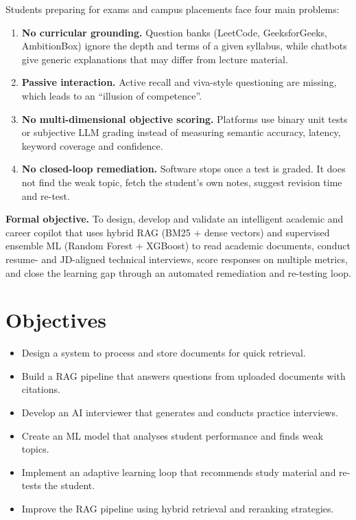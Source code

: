 \documentclass[11pt,a4paper]{report}
\begin{document}
Students preparing for exams and campus placements face four main problems:

\begin{enumerate}
  \item \textbf{No curricular grounding.} Question banks (LeetCode, GeeksforGeeks, AmbitionBox) ignore the depth and terms of a given syllabus, while chatbots give generic explanations that may differ from lecture material.
  \item \textbf{Passive interaction.} Active recall and viva-style questioning are missing, which leads to an ``illusion of competence''.
  \item \textbf{No multi-dimensional objective scoring.} Platforms use binary unit tests or subjective LLM grading instead of measuring semantic accuracy, latency, keyword coverage and confidence.
  \item \textbf{No closed-loop remediation.} Software stops once a test is graded. It does not find the weak topic, fetch the student's own notes, suggest revision time and re-test.
\end{enumerate}

\textbf{Formal objective.} To design, develop and validate an intelligent academic and career copilot that uses hybrid RAG (BM25 + dense vectors) and supervised ensemble ML (Random Forest + XGBoost) to read academic documents, conduct resume- and JD-aligned technical interviews, score responses on multiple metrics, and close the learning gap through an automated remediation and re-testing loop.

\section{Objectives}
\begin{itemize}
  \item Design a system to process and store documents for quick retrieval.
  \item Build a RAG pipeline that answers questions from uploaded documents with citations.
  \item Develop an AI interviewer that generates and conducts practice interviews.
  \item Create an ML model that analyses student performance and finds weak topics.
  \item Implement an adaptive learning loop that recommends study material and re-tests the student.
  \item Improve the RAG pipeline using hybrid retrieval and reranking strategies.
\end{itemize}
\end{document}
